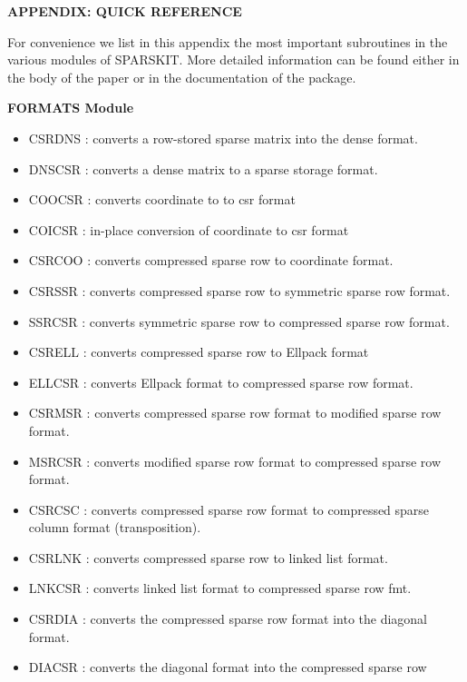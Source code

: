 \documentclass[12pt]{article}
\begin{document}
\newpage

\appendix
\centerline{\bf APPENDIX: QUICK REFERENCE}
\vskip 0.3in

For convenience we list in this 
appendix the most important subroutines in the various
modules of SPARSKIT. More detailed information can be found either
in the body of the paper or in the documentation of the package.

\vskip 0.3in
\centerline{\bf FORMATS Module} 

\begin{itemize} 

\item CSRDNS  : converts a row-stored sparse matrix into the dense format. 
\item DNSCSR  : converts a dense matrix to a sparse storage format.        
\item COOCSR  : converts coordinate to  to csr format                      
\item COICSR  : in-place conversion of coordinate to csr format            
\item CSRCOO  : converts compressed sparse row to coordinate format.
\item CSRSSR  : converts compressed sparse row to symmetric sparse row format.
\item SSRCSR  : converts symmetric sparse row to compressed sparse row format.
\item CSRELL  : converts compressed sparse row to Ellpack format           
\item ELLCSR  : converts Ellpack format to compressed sparse row format.
\item CSRMSR  : converts compressed sparse row format to modified sparse   
           row format.
\item MSRCSR  : converts modified sparse row format to compressed sparse   
           row format.
\item CSRCSC  : converts compressed sparse row format to compressed sparse 
           column format (transposition).
\item CSRLNK  : converts compressed sparse row to linked list format.
\item LNKCSR  : converts linked list format to compressed sparse row fmt.
\item CSRDIA  : converts the compressed sparse row format into the diagonal    
           format.                                                    
\item DIACSR  : converts the diagonal format into the compressed sparse row    

\end{itemize}
\end{document}
